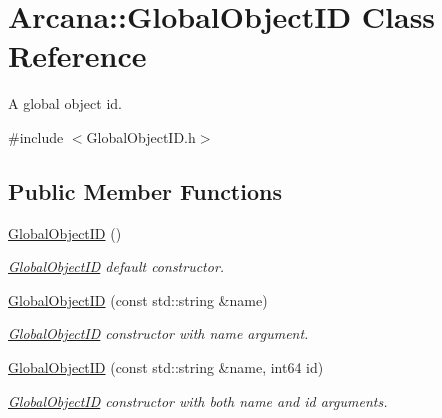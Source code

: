 \hypertarget{class_arcana_1_1_global_object_i_d}{}\section{Arcana\+:\+:Global\+Object\+ID Class Reference}
\label{class_arcana_1_1_global_object_i_d}


A global object id.  




{\ttfamily \#include $<$Global\+Object\+I\+D.\+h$>$}

\subsection*{Public Member Functions}
\begin{DoxyCompactItemize}
\item 
\mbox{\label{class_arcana_1_1_global_object_i_d_aee4024285c58e530085557f363358b36}} 
\mbox{\hyperlink{class_arcana_1_1_global_object_i_d_aee4024285c58e530085557f363358b36}{Global\+Object\+ID}} ()
\begin{DoxyCompactList}\small\item\em \mbox{\hyperlink{class_arcana_1_1_global_object_i_d}{Global\+Object\+ID}} default constructor. \end{DoxyCompactList}\item 
\mbox{\label{class_arcana_1_1_global_object_i_d_a519bd86deae4034f8b0ca32c17b62870}} 
\mbox{\hyperlink{class_arcana_1_1_global_object_i_d_a519bd86deae4034f8b0ca32c17b62870}{Global\+Object\+ID}} (const std\+::string \&name)
\begin{DoxyCompactList}\small\item\em \mbox{\hyperlink{class_arcana_1_1_global_object_i_d}{Global\+Object\+ID}} constructor with name argument. \end{DoxyCompactList}\item 
\mbox{\hyperlink{class_arcana_1_1_global_object_i_d_a85279618fe9f94d268db594a2d07ab2a}{Global\+Object\+ID}} (const std\+::string \&name, int64 id)
\begin{DoxyCompactList}\small\item\em \mbox{\hyperlink{class_arcana_1_1_global_object_i_d}{Global\+Object\+ID}} constructor with both name and id arguments. \end{DoxyCompactList}\item 

\end{DoxyCompactItemize}
